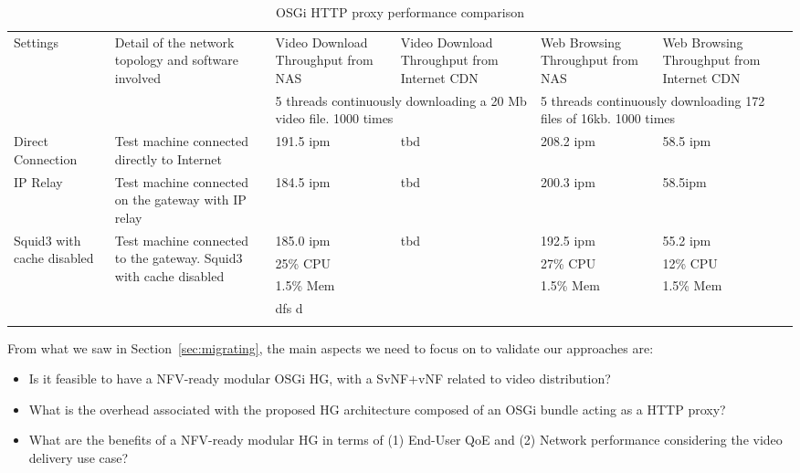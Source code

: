 \begin{table*}
	\centering
	\begin{tabular}{|p{}|p{}||p{}|p{}|p{}|p{}|}
		\hline
		\multirow{2}{0.10\textwidth}{Settings} & \multirow{2}{0.35\textwidth}{Detail of the network topology and software involved}   & Video Download Throughput from NAS       & Video Download Throughput from Internet CDN      & Web Browsing Throughput from NAS & Web Browsing Throughput from Internet CDN \\ \cline{3-6}
		 & & \multicolumn{2}{m{0.20\textwidth}|}{5 threads continuously downloading a 20 Mb video file. 1000 times} & \multicolumn{2}{m{0.20\textwidth}|}{5 threads continuously downloading 172 files of 16kb. 1000 times}\\\hline
		Direct Connection & Test machine connected directly to Internet & 191.5 ipm & tbd & 208.2 ipm & 58.5 ipm \\\hline
		IP Relay  & Test machine connected on the gateway with IP relay & 184.5 ipm & tbd & 200.3 ipm & 58.5ipm\\\hline
		\multirow{3}{0.10\textwidth}{Squid3 with cache disabled} & \multirow{3}{0.35\textwidth}{
		Test machine connected to the gateway. Squid3 with cache disabled} &185.0 ipm & \multirow{3}{*}{tbd} & 192.5 ipm & 55.2 ipm \\
		 & & 25\% CPU & & 27\% CPU & 12\% CPU \\
		 & & 1.5\% Mem & & 1.5\% Mem & 1.5\% Mem \\\hline
		
		&&dfs d&&&\\\hline
		&&&&&\\\hline
                                                
	\end{tabular}
	\caption{
	OSGi HTTP proxy performance comparison
	\label{tab:perf-comparison}
	}
	
\end{table*}


From what we saw in Section~\ref{sec:migrating}, the main aspects we need to focus on to validate our approaches are:
\begin{itemize}
	\item Is it feasible to have a NFV-ready modular OSGi HG, with a SvNF+vNF related to video distribution?
	\item What is the overhead associated with the proposed HG architecture composed of an OSGi bundle acting as a HTTP proxy?
	\item What are the benefits of a NFV-ready modular HG in terms of (1) End-User QoE and (2) Network performance considering the video delivery use case?
\end{itemize}


